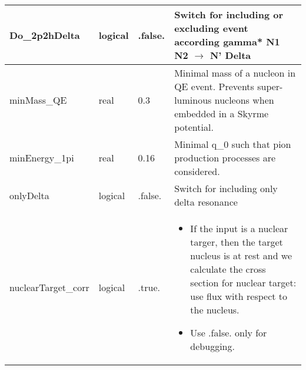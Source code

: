 \documentclass{article}
\begin{document}
\begin{longtable}{llll}
\midrule
Do\_2p2hDelta & \begin{minipage}[t]{2cm}logical\end{minipage} & \begin{minipage}[t]{2cm}.false.\end{minipage} & \begin{minipage}[t]{12cm}Switch for including or excluding event according gamma* N1 N2 $\rightarrow$ N' Delta\end{minipage}\\*
\midrule
minMass\_QE & \begin{minipage}[t]{2cm}real\end{minipage} & \begin{minipage}[t]{2cm}0.3\end{minipage} & \begin{minipage}[t]{12cm}Minimal mass of a nucleon in QE event. Prevents super-luminous nucleons when embedded in a Skyrme potential.\end{minipage}\\*
\midrule
minEnergy\_1pi & \begin{minipage}[t]{2cm}real\end{minipage} & \begin{minipage}[t]{2cm}0.16\end{minipage} & \begin{minipage}[t]{12cm}Minimal q\_0 such that pion production processes are considered.\end{minipage}\\*
\midrule
onlyDelta & \begin{minipage}[t]{2cm}logical\end{minipage} & \begin{minipage}[t]{2cm}.false.\end{minipage} & \begin{minipage}[t]{12cm}Switch for including only delta resonance\end{minipage}\\*
\midrule
nuclearTarget\_corr & \begin{minipage}[t]{2cm}logical\end{minipage} & \begin{minipage}[t]{2cm}.true.\end{minipage} & \begin{minipage}[t]{12cm}\begin{itemize}\leftmargin0em\itemindent0pt\item If the input is a nuclear targer, then the target nucleus is at rest   and we calculate the cross section for   nuclear target: use flux with respect to the nucleus.\item Use .false. only for debugging.\end{itemize}\end{minipage}\\*
\bottomrule
\end{longtable}
{ }
\end{document}
